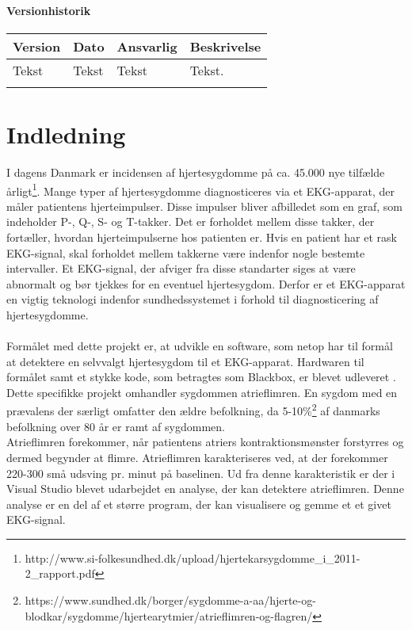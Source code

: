 \subsubsection{Versionhistorik}

\begin{longtabu} to 
    Version &    Dato &    Ansvarlig &    Beskrivelse\\[-1ex]
    \midrule
    Tekst &    Tekst &    Tekst &    Tekst.\\
\label{version_Systemark}
\end{longtabu}

\chapter{Indledning}
I dagens Danmark er incidensen af hjertesygdomme på ca. 45.000 nye tilfælde årligt\footnote{http://www.si-folkesundhed.dk/upload/hjertekarsygdomme\_i\_2011-2\_rapport.pdf}. Mange typer af hjertesygdomme diagnosticeres via et EKG-apparat, der måler patientens hjerteimpulser. Disse impulser bliver afbilledet som en graf, som indeholder P-, Q-, S- og T-takker. Det er forholdet mellem disse takker, der fortæller, hvordan hjerteimpulserne hos patienten er. Hvis en patient har et rask EKG-signal, skal forholdet mellem takkerne være indenfor nogle bestemte intervaller. Et EKG-signal, der afviger fra disse standarter siges at være abnormalt og bør tjekkes for en eventuel hjertesygdom. Derfor er et EKG-apparat en vigtig teknologi indenfor sundhedssystemet i forhold til diagnosticering af hjertesygdomme.\\ \\
Formålet med dette projekt er, at udvikle en software, som netop har til formål at detektere en selvvalgt hjertesygdom til et EKG-apparat. Hardwaren til formålet samt et stykke kode, som betragtes som Blackbox, er blevet udleveret .\\
Dette specifikke projekt omhandler sygdommen atrieflimren. En sygdom med en  prævalens der særligt omfatter den ældre befolkning, da 5-10\%\footnote{https://www.sundhed.dk/borger/sygdomme-a-aa/hjerte-og-blodkar/sygdomme/hjertearytmier/atrieflimren-og-flagren/} af danmarks befolkning over 80 år er ramt af sygdommen.\\
Atrieflimren forekommer, når patientens atriers kontraktionsmønster forstyrres og dermed begynder at flimre. Atrieflimren karakteriseres ved, at der forekommer 220-300 små udsving pr. minut på baselinen. Ud fra denne karakteristik er der i Visual Studio blevet udarbejdet en analyse, der kan detektere atrieflimren. Denne analyse er en del af et større program, der kan visualisere og gemme et et givet EKG-signal.   

  
